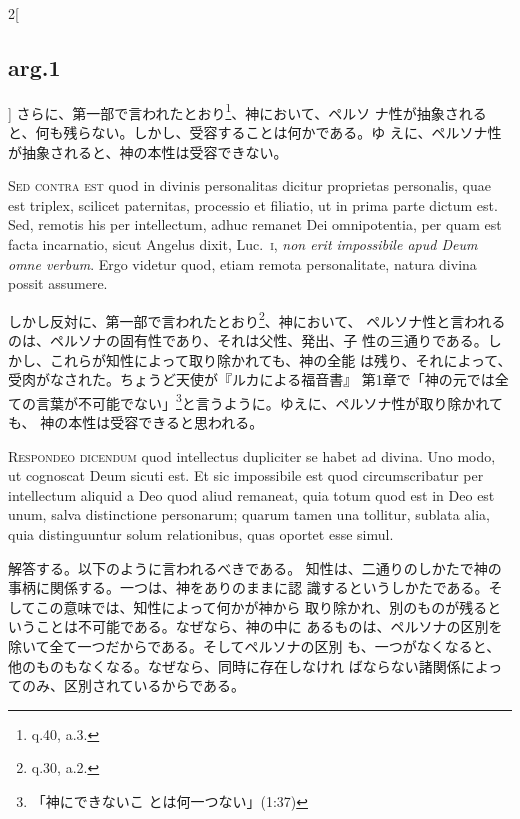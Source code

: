 \documentclass[paper=a4paper,fontsize=10pt,jafontsize=9pt,titlepage]{jlreq}
\begin{document}
\begin{paracol}{2}[\subsection{arg.1}]
さらに、第一部で言われたとおり\footnote{q.40, a.3.}、神において、ペルソ
 ナ性が抽象されると、何も残らない。しかし、受容することは何かである。ゆ
 えに、ペルソナ性が抽象されると、神の本性は受容できない。

\switchcolumn*[\subsection{s.c.}]

{\scshape Sed contra est} quod in divinis personalitas dicitur proprietas
personalis, quae est triplex, scilicet paternitas, processio et
filiatio, ut in prima parte dictum est. Sed, remotis his per
intellectum, adhuc remanet Dei omnipotentia, per quam est facta
incarnatio, sicut Angelus dixit, Luc.~{\scshape i}, {\itshape non erit impossibile apud Deum
omne verbum}. Ergo videtur quod, etiam remota personalitate, natura
divina possit assumere.

\switchcolumn

しかし反対に、第一部で言われたとおり\footnote{q.30, a.2.}、神において、
 ペルソナ性と言われるのは、ペルソナの固有性であり、それは父性、発出、子
 性の三通りである。しかし、これらが知性によって取り除かれても、神の全能
 は残り、それによって、受肉がなされた。ちょうど天使が『ルカによる福音書』
 第1章で「神の元では全ての言葉が不可能でない」\footnote{「神にできないこ
 とは何一つない」(1:37)}と言うように。ゆえに、ペルソナ性が取り除かれても、
 神の本性は受容できると思われる。


{\scshape Respondeo dicendum} quod intellectus dupliciter se habet ad divina. Uno
modo, ut cognoscat Deum sicuti est. Et sic impossibile est quod
circumscribatur per intellectum aliquid a Deo quod aliud remaneat, quia
totum quod est in Deo est unum, salva distinctione personarum; quarum
tamen una tollitur, sublata alia, quia distinguuntur solum relationibus,
quas oportet esse simul.

\switchcolumn

解答する。以下のように言われるべきである。
知性は、二通りのしかたで神の事柄に関係する。一つは、神をありのままに認
 識するというしかたである。そしてこの意味では、知性によって何かが神から
 取り除かれ、別のものが残るということは不可能である。なぜなら、神の中に
 あるものは、ペルソナの区別を除いて全て一つだからである。そしてペルソナの区別
 も、一つがなくなると、他のものもなくなる。なぜなら、同時に存在しなけれ
 ばならない諸関係によってのみ、区別されているからである。


\end{paracol}
\end{document}
